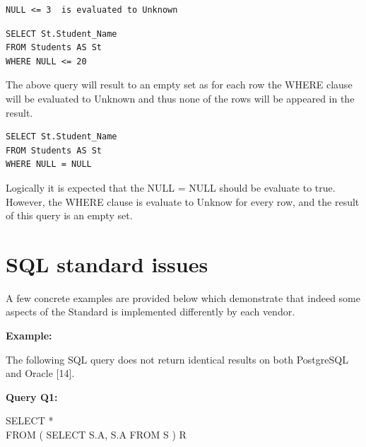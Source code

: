 \begin{mdframed}[nobreak=true, backgroundcolor=lightgray!20] 
\begin{lstlisting}[style=SQL]
NULL <= 3  is evaluated to Unknown 
\end{lstlisting}
\end{mdframed}

\hfill\newline 
\begin{mdframed}[nobreak=true, backgroundcolor=lightgray!20] 
\begin{lstlisting}[style=SQL]
SELECT St.Student_Name
FROM Students AS St 
WHERE NULL <= 20
\end{lstlisting}
\end{mdframed}

The above query will result to an empty set as for each row the WHERE clause will be evaluated to Unknown and thus none of the rows will be appeared in the result. 

\hfill\newline
\begin{mdframed}[nobreak=true, backgroundcolor=lightgray!20] 
\begin{lstlisting}[style=SQL]
SELECT St.Student_Name
FROM Students AS St 
WHERE NULL = NULL
\end{lstlisting}
\end{mdframed}
Logically it is expected that the NULL = NULL should be evaluate to true. However, the WHERE clause is evaluate to Unknow for every row, and the result of this query is an empty set. 

\section{SQL standard issues} 

A few concrete examples are provided below which demonstrate that indeed some aspects of the Standard is implemented differently by each vendor. 
 
\noindent\textbf{Example:}

The following SQL query does not return identical results on both PostgreSQL and Oracle [14]. 

\hfill\newline
\textbf{Query Q1:}
\begin{mdframed}[backgroundcolor=lightgray!20]  
SELECT * 
 \\FROM ( SELECT S.A, S.A FROM S ) R
\end{mdframed}


